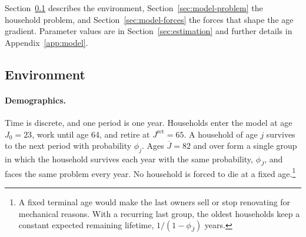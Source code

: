 Section~\ref{sec:model-environment} describes the environment,
Section~\ref{sec:model-problem} the household problem, and
Section~\ref{sec:model-forces} the forces that shape the age gradient.
Parameter values are in Section~\ref{sec:estimation} and further details in
Appendix~\ref{app:model}.

\subsection{Environment}\label{sec:model-environment}

\paragraph{Demographics.}
Time is discrete, and one period is one year. Households enter the model at
age $J_0 = 23$, work until age 64, and retire at $J^{\mathrm{ret}} = 65$. A household of age $j$
survives to the next period with probability $\phi_j$. Ages $\overline J=82$ and over form
a single group in which the household survives each year with the same
probability, $\phi_{\overline J}$, and faces the same problem every year. No
household is forced to die at a fixed age.\footnote{A fixed terminal age
would make the last owners sell or stop renovating for mechanical reasons.
With a recurring last group, the oldest households keep a constant expected
remaining lifetime, $1/(1-\phi_{\overline J})$ years.}




